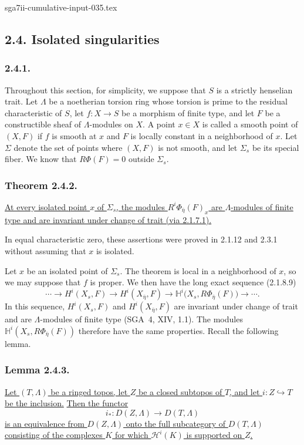 \begin{filecontents*}{sga7ii-cumulative-input-035.tex}
\subsection*{2.4. Isolated singularities}

\subsubsection*{2.4.1.}
Throughout this section, for simplicity, we suppose that $S$ is a
strictly henselian trait.  Let $\Lambda$ be a noetherian torsion ring
whose torsion is prime to the residual characteristic of $S$, let
$f:X\longrightarrow S$ be a morphism of finite type, and let $F$ be a
constructible sheaf of $\Lambda$-modules on $X$.  A point $x\in X$ is
called a smooth point of $(X,F)$ if $f$ is smooth at $x$ and $F$ is
locally constant in a neighborhood of $x$.  Let $\Sigma$ denote the
set of points where $(X,F)$ is not smooth, and let $\Sigma_s$ be its
special fiber.  We know that $R\Phi(F)=0$ outside $\Sigma_s$.

\subsubsection*{Theorem 2.4.2.}
\underline{At every isolated point $x$ of $\Sigma_s$, the modules
$R^i\Phi_{\bar\eta}(F)_x$ are $\Lambda$-modules of finite type and
are invariant under change of trait (via 2.1.7.1).}

In equal characteristic zero, these assertions were proved in
2.1.12 and 2.3.1 without assuming that $x$ is isolated.

Let $x$ be an isolated point of $\Sigma_s$.  The theorem is local in
a neighborhood of $x$, so we may suppose that $f$ is proper.  We then
have the long exact sequence (2.1.8.9)
\[
\cdots\longrightarrow H^i(X_s,F)
\longrightarrow H^i(X_{\bar\eta},F)
\longrightarrow
\mathbb H^i\bigl(X_s,R\Phi_{\bar\eta}(F)\bigr)
\longrightarrow\cdots .
\]
In this sequence, $H^i(X_s,F)$ and $H^i(X_{\bar\eta},F)$ are
invariant under change of trait and are $\Lambda$-modules of finite
type (SGA~4, XIV, 1.1).  The modules
$\mathbb H^i(X_s,R\Phi_{\bar\eta}(F))$ therefore have the same
properties.  Recall the following lemma.

\subsubsection*{Lemma 2.4.3.}
\underline{Let $(T,\Lambda)$ be a ringed topos, let $Z$ be a closed
subtopos of $T$, and let $i:Z\hookrightarrow T$ be the inclusion.}
\underline{Then the functor}
\[
i_*:D(Z,\Lambda)\longrightarrow D(T,\Lambda)
\]
\underline{is an equivalence from $D(Z,\Lambda)$ onto the full
subcategory of $D(T,\Lambda)$ consisting of the complexes $K$ for
which $\mathcal H^i(K)$ is supported on $Z$.}


\end{filecontents*}
